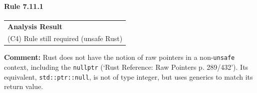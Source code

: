 \paragraph{Rule 7.11.1}
\begin{longtable}{p{13cm}}
\textbf{Analysis Result} \\
(C4) Rule still required (unsafe Rust) \\
\end{longtable}
\textbf{Comment:} Rust does not have the notion of raw pointers in a non-\texttt{unsafe} context, including the \texttt{nullptr} (`Rust Reference: Raw Pointers p. 289/432'). Its equivalent, \texttt{std::ptr::null}, is not of type integer, but uses generics to match its return value. \\
